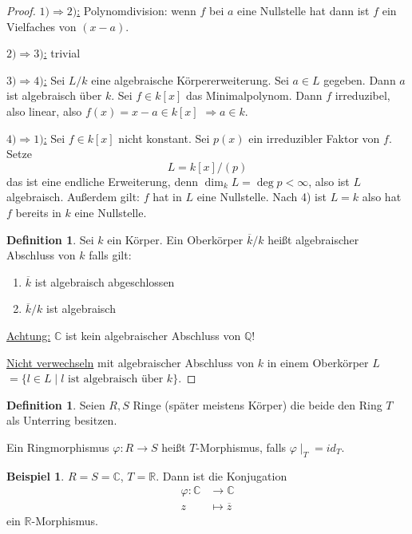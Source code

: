 \documentclass[12pt,parskip=full]{scrartcl}
\newcommand{\setQ}{\mathbb{Q}}
\newcommand{\setR}{\mathbb{R}}
\newcommand{\setC}{\mathbb{C}}
\newcommand{\heading}{\underline}
\theoremstyle{definition}
\newtheorem{definition}[theorem]{Definition}
\newtheorem{example}[theorem]{Beispiel}
\theoremstyle{remark}
\begin{document}
	\begin{proof}
		\heading{$1) \Rightarrow 2)$:} Polynomdivision: wenn $f$ bei $a$ eine Nullstelle hat dann ist $f$ ein Vielfaches von $(x - a)$.
		
		\heading{$2) \Rightarrow 3)$:} trivial
		
		\heading{$3) \Rightarrow 4)$:} Sei $L/k$ eine algebraische Körpererweiterung. Sei $a \in L$ gegeben. Dann $a$ ist algebraisch über $k$. Sei $f \in k[x]$ das Minimalpolynom. Dann $f$ irreduzibel, also linear, also $f(x) = x - a \in k[x]$ $\Rightarrow a \in k$.
		
		\heading{$4) \Rightarrow 1)$:} Sei $f \in k[x]$ nicht konstant. Sei $p(x)$ ein irreduzibler Faktor von $f$. Setze
		\begin{equation*}
			L = k[x]/(p)
		\end{equation*}
		das ist eine endliche Erweiterung, denn $\dim_k L = \deg p < \infty$, also ist $L$ algebraisch.  Außerdem gilt: $f$ hat in $L$ eine Nullstelle. Nach 4) ist $L = k$ also hat $f$ bereits in $k$ eine Nullstelle.
		
		\begin{definition}
			Sei $k$ ein Körper. Ein Oberkörper $\overline{k}/k$ heißt algebraischer Abschluss von $k$ falls gilt:
			\begin{enumerate}
				\item $\overline{k}$ ist algebraisch abgeschlossen
				\item $\overline{k} / k$ ist algebraisch
			\end{enumerate}
		\end{definition}
	
		\heading{Achtung:} $\setC$ ist kein algebraischer Abschluss von $\setQ$!
		
		\heading{Nicht verwechseln} mit algebraischer Abschluss von $k$ in einem Oberkörper $L$ $= \{ l \in L \mid \text{$l$ ist algebraisch über $k$} \}$. 
	\end{proof}

	\begin{definition}
		Seien $R,S$ Ringe (später meistens Körper) die beide den Ring $T$ als Unterring besitzen.
		
		Ein Ringmorphismus $\varphi: R \to S$ heißt $T$-Morphismus, falls $\varphi \mid_T = id_T$.
	\end{definition}

	\begin{example}
		$R = S = \setC$, $T = \setR$. Dann ist die Konjugation
		\begin{align*}
			\varphi: \setC &\to \setC \\
			z &\mapsto \overline{z}
		\end{align*}
		ein $\setR$-Morphismus.
	\end{example}
\end{document}
